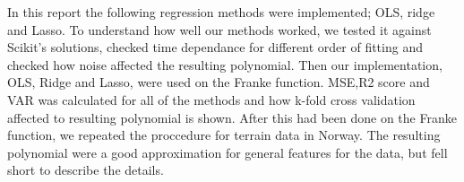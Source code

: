 In this report the following regression methods were implemented; OLS, ridge and Lasso.
To understand how well our methods worked, we tested it against Scikit's solutions,
checked time dependance for different order of fitting and checked how noise affected the
resulting polynomial. Then our implementation, OLS, Ridge and Lasso, were used on the Franke function.
MSE,R2 score and VAR was calculated for all of the methods and how k-fold cross validation
affected to resulting polynomial is shown. After this had been done on the Franke function,
we repeated the proccedure for terrain data in Norway. The resulting polynomial were a good
approximation for general features for the data, but fell short to describe the details.
